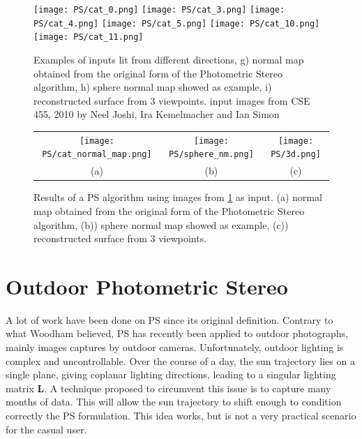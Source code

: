 
\begin{figure}
\centering
\texttt{[image: PS/cat\_0.png]}
\texttt{[image: PS/cat\_3.png]}
\texttt{[image: PS/cat\_4.png]}
\texttt{[image: PS/cat\_5.png]}
\texttt{[image: PS/cat\_10.png]}
\texttt{[image: PS/cat\_11.png]}
\caption{Examples of inputs lit from different directions, g) normal map obtained from the original form of the Photometric Stereo algorithm, h) sphere normal map showed as example, i) reconstructed surface from 3 viewpoints.\newline
{\small input images from CSE 455, 2010 by Neel Joshi, Ira Kemelmacher and Ian Simon}
}
\label{fig:PS_example}
\end{figure}

\begin{figure}
\begin{tabular}{ccc}
\texttt{[image: PS/cat\_normal\_map.png]} &
\texttt{[image: PS/sphere\_nm.png]} &
\texttt{[image: PS/3d.png]} \\
(a) & (b) & (c)
\end{tabular}
\caption{Results of a PS algorithm using images from \ref{fig:PS_example} as input. (a) normal map obtained from the original form of the Photometric Stereo algorithm, (b)) sphere normal map showed as example, (c)) reconstructed surface from 3 viewpoints.}
\label{fig:PS_example_res}
\end{figure}

\section{Outdoor Photometric Stereo}

A lot of work have been done on PS since its original definition. Contrary to what Woodham believed, PS has recently been applied to outdoor photographs, mainly images captures by outdoor cameras. Unfortunately, outdoor lighting is complex and uncontrollable. Over the course of a day, the sun trajectory lies on a single plane, giving coplanar lighting directions, leading to a singular lighting matrix $\mathbf{L}$. A technique proposed to circumvent this issue is to capture many months of data. This will allow the sun trajectory to shift enough to condition correctly the PS formulation. This idea works, but is not a very practical scenario for the casual user.

